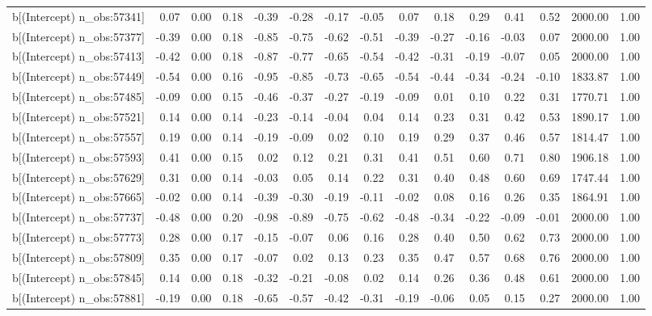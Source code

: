 \begin{table}[ht]
\begin{tabular}{rrrrrrrrrrrrrrr}
  b[(Intercept) n\_obs:57341] & 0.07 & 0.00 & 0.18 & -0.39 & -0.28 & -0.17 & -0.05 & 0.07 & 0.18 & 0.29 & 0.41 & 0.52 & 2000.00 & 1.00 \\ 
  b[(Intercept) n\_obs:57377] & -0.39 & 0.00 & 0.18 & -0.85 & -0.75 & -0.62 & -0.51 & -0.39 & -0.27 & -0.16 & -0.03 & 0.07 & 2000.00 & 1.00 \\ 
  b[(Intercept) n\_obs:57413] & -0.42 & 0.00 & 0.18 & -0.87 & -0.77 & -0.65 & -0.54 & -0.42 & -0.31 & -0.19 & -0.07 & 0.05 & 2000.00 & 1.00 \\ 
  b[(Intercept) n\_obs:57449] & -0.54 & 0.00 & 0.16 & -0.95 & -0.85 & -0.73 & -0.65 & -0.54 & -0.44 & -0.34 & -0.24 & -0.10 & 1833.87 & 1.00 \\ 
  b[(Intercept) n\_obs:57485] & -0.09 & 0.00 & 0.15 & -0.46 & -0.37 & -0.27 & -0.19 & -0.09 & 0.01 & 0.10 & 0.22 & 0.31 & 1770.71 & 1.00 \\ 
  b[(Intercept) n\_obs:57521] & 0.14 & 0.00 & 0.14 & -0.23 & -0.14 & -0.04 & 0.04 & 0.14 & 0.23 & 0.31 & 0.42 & 0.53 & 1890.17 & 1.00 \\ 
  b[(Intercept) n\_obs:57557] & 0.19 & 0.00 & 0.14 & -0.19 & -0.09 & 0.02 & 0.10 & 0.19 & 0.29 & 0.37 & 0.46 & 0.57 & 1814.47 & 1.00 \\ 
  b[(Intercept) n\_obs:57593] & 0.41 & 0.00 & 0.15 & 0.02 & 0.12 & 0.21 & 0.31 & 0.41 & 0.51 & 0.60 & 0.71 & 0.80 & 1906.18 & 1.00 \\ 
  b[(Intercept) n\_obs:57629] & 0.31 & 0.00 & 0.14 & -0.03 & 0.05 & 0.14 & 0.22 & 0.31 & 0.40 & 0.48 & 0.60 & 0.69 & 1747.44 & 1.00 \\ 
  b[(Intercept) n\_obs:57665] & -0.02 & 0.00 & 0.14 & -0.39 & -0.30 & -0.19 & -0.11 & -0.02 & 0.08 & 0.16 & 0.26 & 0.35 & 1864.91 & 1.00 \\ 
  b[(Intercept) n\_obs:57737] & -0.48 & 0.00 & 0.20 & -0.98 & -0.89 & -0.75 & -0.62 & -0.48 & -0.34 & -0.22 & -0.09 & -0.01 & 2000.00 & 1.00 \\ 
  b[(Intercept) n\_obs:57773] & 0.28 & 0.00 & 0.17 & -0.15 & -0.07 & 0.06 & 0.16 & 0.28 & 0.40 & 0.50 & 0.62 & 0.73 & 2000.00 & 1.00 \\ 
  b[(Intercept) n\_obs:57809] & 0.35 & 0.00 & 0.17 & -0.07 & 0.02 & 0.13 & 0.23 & 0.35 & 0.47 & 0.57 & 0.68 & 0.76 & 2000.00 & 1.00 \\ 
  b[(Intercept) n\_obs:57845] & 0.14 & 0.00 & 0.18 & -0.32 & -0.21 & -0.08 & 0.02 & 0.14 & 0.26 & 0.36 & 0.48 & 0.61 & 2000.00 & 1.00 \\ 
  b[(Intercept) n\_obs:57881] & -0.19 & 0.00 & 0.18 & -0.65 & -0.57 & -0.42 & -0.31 & -0.19 & -0.06 & 0.05 & 0.15 & 0.27 & 2000.00 & 1.00 \\ 

\end{tabular}
\end{table}

